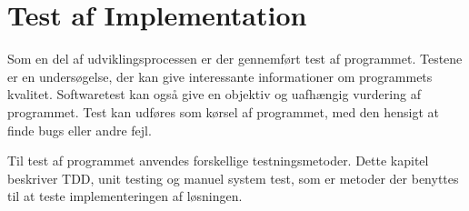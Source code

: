 \chapter{Test af Implementation}

Som en del af udviklingsprocessen er der gennemført test af programmet. Testene er en undersøgelse, der kan give interessante informationer om programmets kvalitet. Softwaretest kan også give en objektiv og uafhængig vurdering af programmet. Test kan udføres som kørsel af programmet, med den hensigt at finde bugs eller andre fejl.

Til test af programmet anvendes forskellige testningsmetoder. Dette kapitel beskriver TDD, unit testing og manuel system test, som er metoder der benyttes til at teste implementeringen af løsningen.




